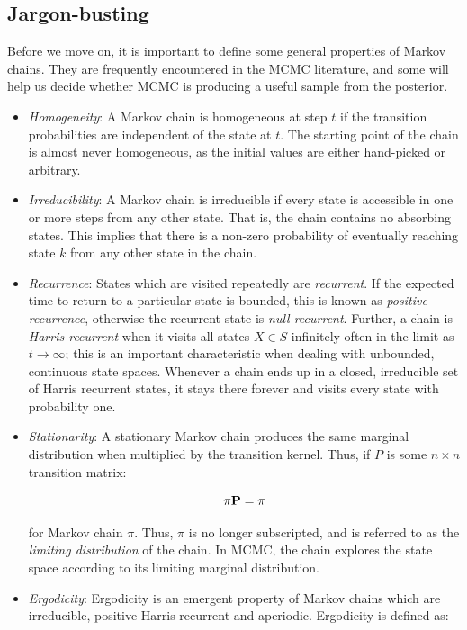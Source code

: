 \documentclass[]{book}
\begin{document}
\subsection{Jargon-busting}

Before we move on, it is important to define some general properties of Markov chains. They are frequently encountered in the MCMC literature, and some will help us decide whether MCMC is producing a useful sample from the posterior.

\begin{itemize}
\item \emph{Homogeneity}: A Markov chain is homogeneous at step $t$ if the transition probabilities are independent of the state at $t$. The starting point of the chain is almost never homogeneous, as the initial values are either hand-picked or arbitrary.
\item \emph{Irreducibility}: A Markov chain is irreducible if every state is accessible in one or more steps from any other state. That is, the chain contains no absorbing states. This implies that there is a non-zero probability of eventually reaching state $k$ from any other state in the chain.
\item \emph{Recurrence}: States which are visited repeatedly are \emph{recurrent}. If the expected time to return to a particular state is bounded, this is known as \emph{positive recurrence}, otherwise the recurrent state is \emph{null recurrent}. Further, a chain is \emph{Harris recurrent} when it visits all states $X \in S$ infinitely often in the limit as $t \to \infty$; this is an important characteristic when dealing with unbounded, continuous state spaces. Whenever a chain ends up in a closed, irreducible set of Harris recurrent states, it stays there forever and visits every state with probability one.
\item \emph{Stationarity}: A stationary Markov chain produces the same marginal distribution when multiplied by the transition kernel.  Thus, if $P$ is some $n \times n$ transition matrix:

\[{\bf \pi P} = {\bf \pi}\]

\noindent for Markov chain $\pi$. Thus, $\pi$ is no longer subscripted, and is referred to as the \emph{limiting distribution} of the chain. In MCMC, the chain explores the state space according to its limiting marginal distribution.
\item \emph{Ergodicity}: Ergodicity is an emergent property of Markov chains which are irreducible, positive Harris recurrent and aperiodic. Ergodicity is defined as:


\end{itemize}
\end{document}
